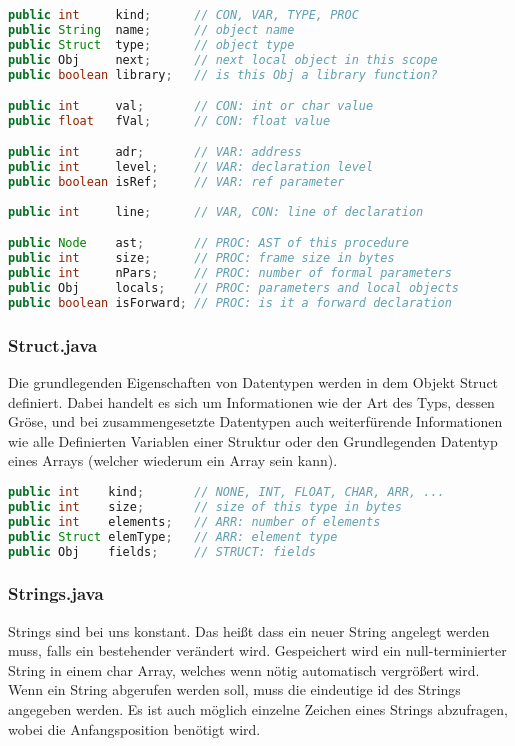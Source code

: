 \begin{lstlisting}[language=Java]
public int     kind;      // CON, VAR, TYPE, PROC
public String  name;      // object name
public Struct  type;      // object type
public Obj     next;      // next local object in this scope
public boolean library;   // is this Obj a library function?

public int     val;       // CON: int or char value
public float   fVal;      // CON: float value

public int     adr;       // VAR: address
public int     level;     // VAR: declaration level
public boolean isRef;     // VAR: ref parameter
	
public int     line;      // VAR, CON: line of declaration

public Node    ast;       // PROC: AST of this procedure
public int     size;      // PROC: frame size in bytes
public int     nPars;     // PROC: number of formal parameters
public Obj     locals;    // PROC: parameters and local objects
public boolean isForward; // PROC: is it a forward declaration
\end{lstlisting}


\subsubsection{Struct.java}

Die grundlegenden Eigenschaften von Datentypen werden in dem Objekt Struct definiert. Dabei handelt es sich um Informationen wie der Art des Typs, dessen Gr\"ose, und bei zusammengesetzte Datentypen auch weiterf\"urende Informationen wie alle Definierten Variablen einer Struktur oder den Grundlegenden Datentyp eines Arrays (welcher wiederum ein Array sein kann).

\begin{lstlisting}[language=Java]
public int    kind;       // NONE, INT, FLOAT, CHAR, ARR, ...
public int    size;       // size of this type in bytes
public int    elements;   // ARR: number of elements
public Struct elemType;   // ARR: element type
public Obj    fields;     // STRUCT: fields
\end{lstlisting}

\subsubsection{Strings.java}

Strings sind bei uns konstant. Das hei\ss{}t dass ein neuer String angelegt werden muss, falls ein bestehender ver\"andert wird. Gespeichert wird ein null-terminierter String in einem char Array, welches wenn n\"otig automatisch vergr\"o\ss{}ert wird. Wenn ein String abgerufen werden soll, muss die eindeutige id des Strings angegeben werden. Es ist auch m\"oglich einzelne Zeichen eines Strings abzufragen, wobei die Anfangsposition ben\"otigt wird.

